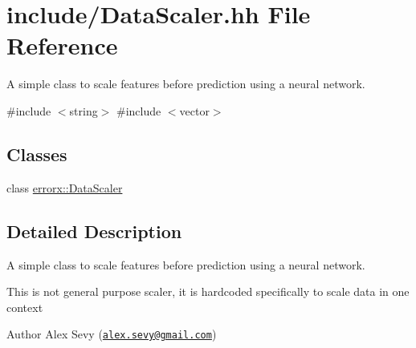 \hypertarget{_data_scaler_8hh}{}\section{include/\+Data\+Scaler.hh File Reference}
\label{_data_scaler_8hh}


A simple class to scale features before prediction using a neural network.  


{\ttfamily \#include $<$string$>$}\newline
{\ttfamily \#include $<$vector$>$}\newline
\subsection*{Classes}
\begin{DoxyCompactItemize}
\item 
class \mbox{\hyperlink{classerrorx_1_1_data_scaler}{errorx\+::\+Data\+Scaler}}
\end{DoxyCompactItemize}


\subsection{Detailed Description}
A simple class to scale features before prediction using a neural network. 

This is not general purpose scaler, it is hardcoded specifically to scale data in one context \begin{DoxyAuthor}{Author}
Alex Sevy (\href{mailto:alex.sevy@gmail.com}{\tt alex.\+sevy@gmail.\+com}) 
\end{DoxyAuthor}
